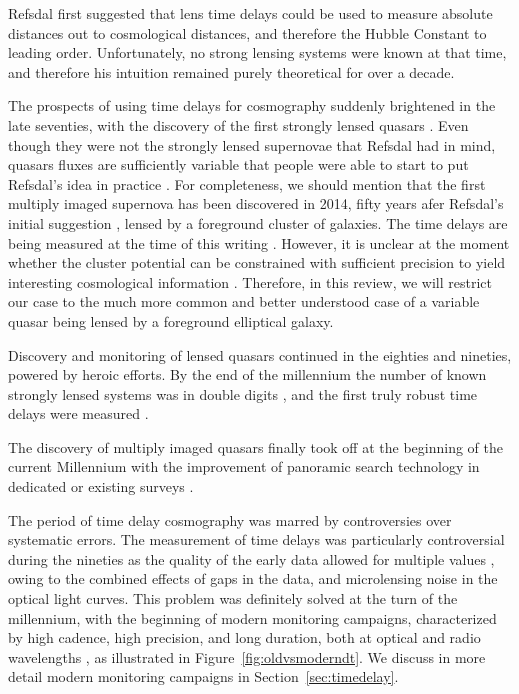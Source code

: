 Refsdal \cite{Ref64} first suggested that lens time delays could be
used to measure absolute distances out to cosmological distances, and
therefore the Hubble Constant to leading order. Unfortunately, no
strong lensing systems were known at that time, and therefore his
intuition remained purely theoretical for over a decade. 

The prospects of using time delays for cosmography suddenly brightened
in the late seventies, with the discovery of the first strongly lensed
quasars \cite{WCW79}. Even though they were not the strongly lensed
supernovae that Refsdal had in mind, quasars fluxes are sufficiently
variable \cite{Van82} that people were able to start to put Refsdal's
idea in practice \cite{Van89}. For completeness, we should mention
that the first multiply imaged supernova has been discovered in 2014,
fifty years afer Refsdal's initial suggestion \cite{Kel++15}, lensed
by a foreground cluster of galaxies. The time delays are being
measured at the time of this writing
\cite{Rod++16,Kel++16}. However, it is unclear at the moment whether the 
cluster potential can be constrained with sufficient precision to
yield interesting cosmological information \cite{Tre++16}. Therefore,
in this review, we will restrict our case to the much more common and
better understood case of a variable quasar being lensed by a
foreground elliptical galaxy.

Discovery and monitoring of lensed quasars continued in the eighties
and nineties, powered by heroic efforts. By the end of the millennium
the number of known strongly lensed systems was in double digits
\cite{CSS02}, and the first truly robust time delays were measured
\cite{Kun++97,Sch++97}. 

The discovery of multiply imaged quasars finally took off at the
beginning of the current Millennium with the improvement of panoramic
search technology in dedicated or existing surveys
\cite{Bro++03,Oguri:2006p5865,Agn++15}.

The period of time delay cosmography was marred by controversies over
systematic errors.  The measurement of time delays was particularly
controversial during the nineties as the quality of the early data
allowed for multiple values \cite{PRH92}, owing to the combined
effects of gaps in the data, and microlensing noise in the optical
light curves. This problem was definitely solved at the turn of the
millennium, with the beginning of modern monitoring campaigns,
characterized by high cadence, high precision, and long duration, both
at optical and radio wavelengths
\cite{Fas++99,Fas++02,Bur++02,Eig++05}, as illustrated in Figure~\ref{fig:oldvsmoderndt}. We discuss in more detail 
modern monitoring campaigns in Section~\ref{sec:timedelay}.

